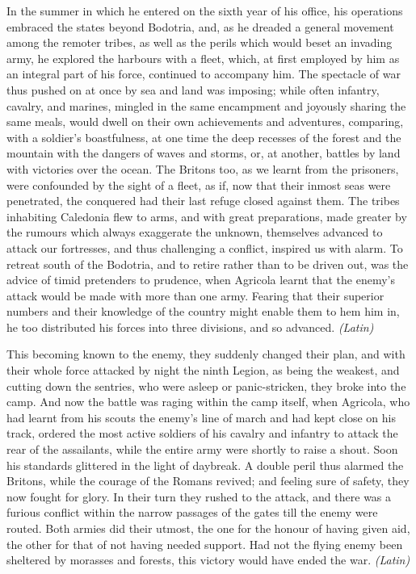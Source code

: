 In the summer in which he entered on the sixth year of his office, his operations embraced the states beyond Bodotria, and, as he dreaded a general movement among the remoter tribes, as well as the perils which would beset an invading army, he explored the harbours with a fleet, which, at first employed by him as an integral part of his force, continued to accompany him. The spectacle of war thus pushed on at once by sea and land was imposing; while often infantry, cavalry, and marines, mingled in the same encampment and joyously sharing the same meals, would dwell on their own achievements and adventures, comparing, with a soldier's boastfulness, at one time the deep recesses of the forest and the mountain with the dangers of waves and storms, or, at another, battles by land with victories over the ocean. The Britons too, as we learnt from the prisoners, were confounded by the sight of a fleet, as if, now that their inmost seas were penetrated, the conquered had their last refuge closed against them. The tribes inhabiting Caledonia flew to arms, and with great preparations, made greater by the rumours which always exaggerate the unknown, themselves advanced to attack our fortresses, and thus challenging a conflict, inspired us with alarm. To retreat south of the Bodotria, and to retire rather than to be driven out, was the advice of timid pretenders to prudence, when Agricola learnt that the enemy's attack would be made with more than one army. Fearing that their superior numbers and their knowledge of the country might enable them to hem him in, he too distributed his forces into three divisions, and so advanced. \emph{(Latin)}


This becoming known to the enemy, they suddenly changed their plan, and with their whole force attacked by night the ninth Legion, as being the weakest, and cutting down the sentries, who were asleep or panic-stricken, they broke into the camp. And now the battle was raging within the camp itself, when Agricola, who had learnt from his scouts the enemy's line of march and had kept close on his track, ordered the most active soldiers of his cavalry and infantry to attack the rear of the assailants, while the entire army were shortly to raise a shout. Soon his standards glittered in the light of daybreak. A double peril thus alarmed the Britons, while the courage of the Romans revived; and feeling sure of safety, they now fought for glory. In their turn they rushed to the attack, and there was a furious conflict within the narrow passages of the gates till the enemy were routed. Both armies did their utmost, the one for the honour of having given aid, the other for that of not having needed support. Had not the flying enemy been sheltered by morasses and forests, this victory would have ended the war. \emph{(Latin)}

